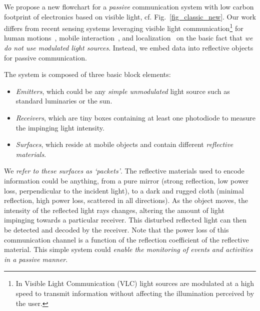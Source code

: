 \documentclass[10pt]{sig-alternate-05-2015}
\begin{document}
We propose a new flowchart for a \emph{passive} communication system with low carbon footprint of electronics based on visible light, cf. Fig.~\ref{fig_classic_new}. {Our work differs from recent sensing systems {leveraging visible light communication}\footnote{In Visible Light Communication (VLC) light sources are modulated at a high speed to transmit information without affecting the illumination perceived by the user.} for human motions}~\cite{Li:2015-mobicom,Li:2016-mobisys}, mobile interaction~\cite{Zhang:2015}, and localization~\cite{Li2014NSDI,Kuo2014} on the basic fact that \emph{we do not use modulated light sources}. Instead, we embed data into reflective objects for passive communication.

The system is composed of three basic block elements:
\begin{itemize}
	\item \emph{Emitters}, which could be any \emph{simple unmodulated} light source such as standard luminaries or the sun.
	\item \emph{Receivers}, which are tiny boxes containing at least one photodiode to measure the impinging light intensity.
	\item \emph{Surfaces}, which reside at mobile objects and contain different \emph{reflective materials}.
\end{itemize}

We \textit{refer to these surfaces as `packets'}. 
The reflective materials used to encode information could be anything, from a pure mirror (strong reflection, {low power loss}, perpendicular to the incident light), to a dark and rugged cloth (minimal reflection, {high power loss}, scattered in all directions). As the object moves, the intensity of the reflected light rays changes, altering the amount of light impinging towards a particular receiver. This disturbed reflected light can then be detected and decoded by the receiver. Note that the power loss of this communication channel is a function of the reflection coefficient of the reflective material. This simple system could \emph{enable the monitoring of events and activities in a passive manner}. 
\end{document}
